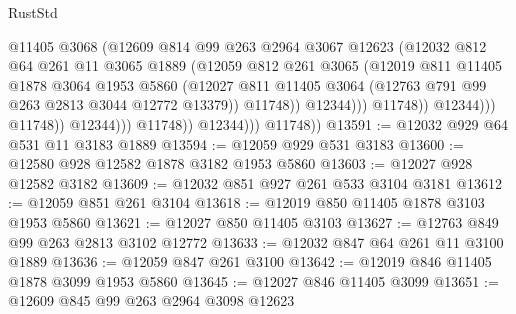 \begin{lexlean}{RustStd}
\begin{coremodule}
                                        @11405
                                        @3068
                                        (@12609
                                          @814
                                          @99
                                          @263
                                          @2964
                                          @3067
                                          @12623
                                          (@12032
                                            @812
                                            @64
                                            @261
                                            @11
                                            @3065
                                            @1889
                                            (@12059
                                              @812
                                              @261
                                              @3065
                                              (@12019
                                                @811
                                                @11405
                                                @1878
                                                @3064
                                                @1953
                                                @5860
                                                (@12027
                                                  @811
                                                  @11405
                                                  @3064
                                                  (@12763 @791 @99 @263 @2813 @3044 @12772 @13379))
                                                @11748))
                                            @12344)))
                                      @11748))
                                  @12344)))
                            @11748))
                        @12344)))
                  @11748))
              @12344)))
        @11748))
@13591 := @12032 @929 @64 @531 @11 @3183 @1889
@13594 := @12059 @929 @531 @3183
@13600 := @12580 @928 @12582 @1878 @3182 @1953 @5860
@13603 := @12027 @928 @12582 @3182
@13609 := @12032 @851 @927 @261 @533 @3104 @3181
@13612 := @12059 @851 @261 @3104
@13618 := @12019 @850 @11405 @1878 @3103 @1953 @5860
@13621 := @12027 @850 @11405 @3103
@13627 := @12763 @849 @99 @263 @2813 @3102 @12772
@13633 := @12032 @847 @64 @261 @11 @3100 @1889
@13636 := @12059 @847 @261 @3100
@13642 := @12019 @846 @11405 @1878 @3099 @1953 @5860
@13645 := @12027 @846 @11405 @3099
@13651 := @12609 @845 @99 @263 @2964 @3098 @12623

\end{coremodule}
\end{lexlean}
